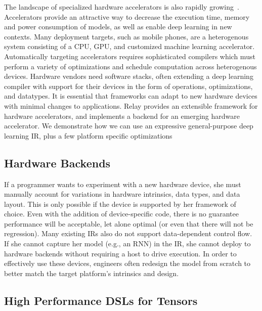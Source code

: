 The landscape of specialized hardware
  accelerators is also rapidly growing~\citep{
    moreau2018vta, OpenTPU, tpuv1}.
Accelerators provide an attractive way to decrease
  the execution time, memory and power consumption of models, as well
  as enable deep learning in new contexts.
Many deployment targets, such as mobile phones, are a heterogenous system
  consisting of a CPU, GPU, and customized machine learning accelerator.
Automatically targeting accelerators requires sophisticated compilers which
  must perform a variety of optimizations and schedule computation across
  heterogenous devices.
Hardware vendors need software stacks, often extending a deep learning
  compiler with support for their devices in the form of operations,
  optimizations, and datatypes.
It is essential that frameworks can adapt to new hardware devices
  with minimal changes to applications.
Relay provides an extensible framework for hardware accelerators,
  and implements a backend for \vta an emerging hardware accelerator\citep{moreau2018vta}.
We demonstrate how we can use an expressive general-purpose deep learning IR, plus
  a few platform specific optimizations

  \subsection{Hardware Backends}

If a programmer wants to experiment with a new hardware device,
  she must manually account for variations in hardware intrinsics, data
  types, and data layout.
This is only possible if the device is supported by her framework of choice.
Even with the addition of device-specific code,
  there is no guarantee performance will be acceptable, let alone optimal
  (or even that there will not be regression).
Many existing IRs also do not support data-dependent control flow.
If she cannot capture her model (e.g., an RNN) in the IR,
  she cannot deploy to hardware backends without requiring a host to drive
  execution.
In order to effectively use these devices,
  engineers often redesign the model from scratch to better match the target
  platform's intrinsics and design.

\subsection{High Performance DSLs for Tensors}

